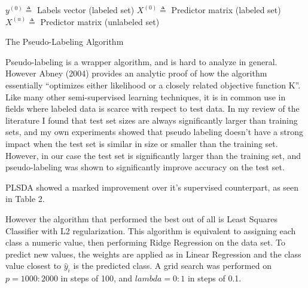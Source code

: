 \documentclass[conference,final,]{IEEEtran}
\begin{document}
\begin{algorithm}
  $y^{(0)} \triangleq$ Labels vector (labeled set)\;
  $X^{(0)} \triangleq$ Predictor matrix (labeled set)\;
  $X^{(u)} \triangleq$ Predictor matrix (unlabeled set)\;
  

\caption{The Pseudo-Labeling Algorithm}

\end{algorithm}

Pseudo-labeling is a wrapper algorithm, and is hard to analyze in
general. However Abney (2004) provides an analytic proof of how the
algorithm essentially ``optimizes either likelihood or a closely related
objective function K''. Like many other semi-supervised learning
techniques, it is in common use in fields where labeled data is scarce
with respect to test data. In my review of the literature I found that
test set sizes are always significantly larger than training sets, and
my own experiments showed that pseudo labeling doesn't have a strong
impact when the test set is similar in size or smaller than the training
set. However, in our case the test set is significantly larger than the
training set, and pseudo-labeling was shown to significantly improve
accuracy on the test set.

PLSDA showed a marked improvement over it's supervised counterpart, as
seen in Table 2.

However the algorithm that performed the best out of all is Least
Squares Classifier with L2 regularization. This algorithm is equivalent
to assigning each class a numeric value, then performing Ridge
Regression on the data set. To predict new values, the weights are
applied as in Linear Regression and the class value closest to
\(\hat y_i\) is the predicted class. A grid search was performed on
\(p=1000:2000\) in steps of 100, and \(lambda=0:1\) in steps of 0.1.
\end{document}

